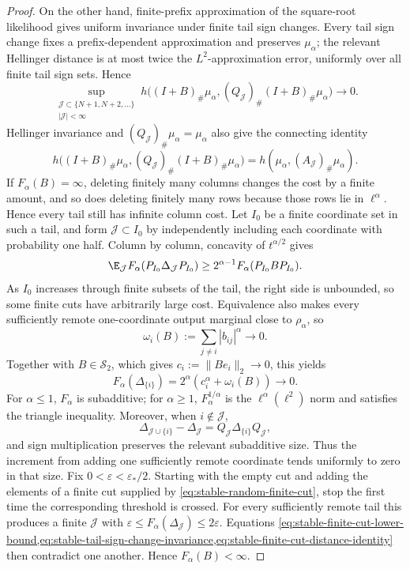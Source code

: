 \begin{proof}
On the other hand, finite-prefix approximation of the square-root likelihood
gives uniform invariance under finite tail sign changes.  Every tail sign
change fixes a prefix-dependent approximation and preserves \(\mu_\alpha\);
the relevant Hellinger distance is at most twice the \(L^2\)-approximation
error, uniformly over all finite tail sign sets.  Hence
\begin{equation}
 \sup_{\substack{\mathcal J\subset\{N+1,N+2,\ldots\}\\ |\mathcal J|<\infty}}
 h\bigl((I+B)_\#\mu_\alpha,
        (Q_{\mathcal J})_\#(I+B)_\#\mu_\alpha\bigr)
 \longrightarrow0.
 \label{eq:stable-tail-sign-change-invariance}
\end{equation}
Hellinger invariance and \((Q_{\mathcal J})_\#\mu_\alpha=\mu_\alpha\) also give the
connecting identity
\begin{equation}
 h\bigl((I+B)_\#\mu_\alpha,
        (Q_{\mathcal J})_\#(I+B)_\#\mu_\alpha\bigr)
 =h(\mu_\alpha,(A_{\mathcal J})_\#\mu_\alpha).
 \label{eq:stable-finite-cut-distance-identity}
\end{equation}
If \(F_\alpha(B)=\infty\), deleting finitely many columns changes the cost
by a finite amount, and so does deleting finitely many rows because those
rows lie in \(\ell^\alpha\).
Hence every tail still has infinite column cost.
Let \(I_0\) be a finite coordinate set in such a tail, and
form \(\mathcal J\subset I_0\) by independently including each
coordinate with probability
one half.
Column by column, concavity of \(t^{\alpha/2}\) gives
\begin{equation}
 \E_{\mathcal J}F_\alpha(P_{I_0}\Delta_{\mathcal J}P_{I_0})
 \ge2^{\alpha-1}F_\alpha(P_{I_0}BP_{I_0}).
 \label{eq:stable-random-finite-cut}
\end{equation}
As \(I_0\) increases through finite subsets of the tail, the right side is
unbounded, so some finite cuts have arbitrarily large cost.
Equivalence also makes every sufficiently remote one-coordinate output
marginal close to \(\rho_\alpha\), so
\[
 \omega_i(B):=\sum_{j\ne i}|b_{ij}|^\alpha\longrightarrow0.
\]
Together with \(B\in\mathcal S_2\), which gives
\(c_i:=\|Be_i\|_2\to0\), this yields
\[
 F_\alpha(\Delta_{\{i\}})
 =2^\alpha(c_i^\alpha+\omega_i(B))\longrightarrow0.
\]
For \(\alpha\le1\), \(F_\alpha\) is subadditive; for \(\alpha\ge1\),
\(F_\alpha^{1/\alpha}\) is the \(\ell^\alpha(\ell^2)\) norm and satisfies
the triangle inequality.
Moreover, when \(i\notin\mathcal J\),
\[
 \Delta_{\mathcal J\cup\{i\}}-\Delta_{\mathcal J}
 =Q_{\mathcal J}\Delta_{\{i\}}Q_{\mathcal J},
\]
and sign multiplication preserves the relevant subadditive size.
Thus the increment from adding one sufficiently remote coordinate tends
uniformly to zero in that size.
Fix \(0<\varepsilon<\varepsilon_*/2\).
Starting with the empty cut and adding the elements of a finite cut supplied
by \eqref{eq:stable-random-finite-cut}, stop the first time the corresponding
threshold is crossed.
For every sufficiently remote tail this produces a finite \(\mathcal J\) with
\(\varepsilon\le F_\alpha(\Delta_{\mathcal J})\le2\varepsilon\).
Equations
\cref{eq:stable-finite-cut-lower-bound,eq:stable-tail-sign-change-invariance,eq:stable-finite-cut-distance-identity} then contradict one another.
Hence \(F_\alpha(B)<\infty\).


\end{proof}
